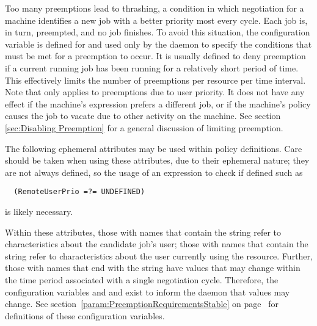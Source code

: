 Too many preemptions lead to thrashing,
a condition in which negotiation for a machine identifies a
new job with a better priority most every cycle.
Each job is, in turn, preempted, and no job finishes.
To avoid this situation, the  
configuration variable is defined for and used only by 
the  daemon
to specify the conditions that must be met for a preemption to
occur.  It is usually defined to deny preemption if a current running
job has been running for a relatively short period of time.  This
effectively limits the number of preemptions per resource per time
interval.
Note that  only applies to preemptions
due to user priority.  It does not have any effect if the machine's 
expression prefers a different job, or if the machine's policy
causes the job to vacate due to other activity on the machine.
See section \ref{sec:Disabling Preemption} for a general discussion of
limiting preemption.

The following ephemeral attributes may be used within policy definitions.
Care should be taken when using these attributes, 
due to their ephemeral nature;
they are not always defined, so the usage of an expression to 
check if defined such as
\begin{verbatim}
  (RemoteUserPrio =?= UNDEFINED)
\end{verbatim}
is likely necessary.

Within these attributes, those with names that contain the
string  refer to characteristics about the candidate job's user;
those with names that contain the string 
refer to characteristics about the user currently using the resource.
Further,  those with names that end with the
string  have values that may change within
the time period associated with a single negotiation cycle.
Therefore, the configuration variables 
and and  exist to inform the 
 daemon that values may change.
See section~\ref{param:PreemptionRequirementsStable} on
page~\pageref{param:PreemptionRequirementsStable} for
definitions of these configuration variables.

